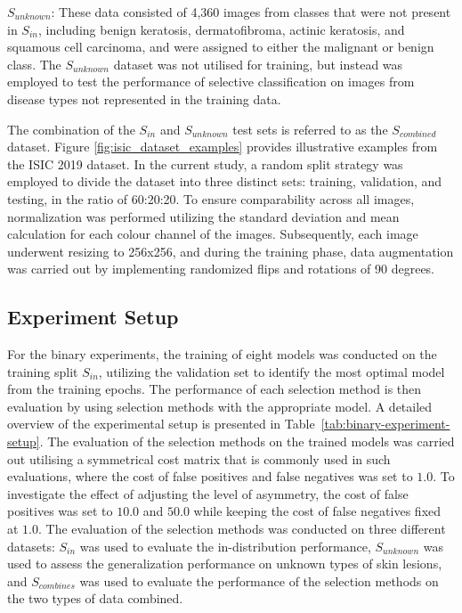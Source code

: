 $S_{unknown}$: These data consisted of 4,360 images from classes that were not present in $S_{in}$, including benign keratosis, dermatofibroma, actinic keratosis, and squamous cell carcinoma, and were assigned to either the malignant or benign class. The $S_{unknown}$ dataset was not utilised for training, but instead was employed to test the performance of selective classification on images from disease types not represented in the training data.

The combination of the $S_{in}$ and $S_{unknown}$ test sets is referred to as the $S_{combined}$ dataset. Figure \ref{fig:isic_dataset_examples} provides illustrative examples from the ISIC 2019 dataset. In the current study, a random split strategy was employed to divide the dataset into three distinct sets: training, validation, and testing, in the ratio of 60:20:20. To ensure comparability across all images, normalization was performed utilizing the standard deviation and mean calculation for each colour channel of the images. Subsequently, each image underwent resizing to 256x256, and during the training phase, data augmentation was carried out by implementing randomized flips and rotations of 90 degrees.

\subsection{Experiment Setup}
For the binary experiments, the training of eight models was conducted on the training split $S_{in}$, utilizing the validation set to identify the most optimal model from the training epochs. The performance of each selection method is then evaluation by using selection methods with the appropriate model. A detailed overview of the experimental setup is presented in Table~\ref{tab:binary-experiment-setup}. The evaluation of the selection methods on the trained models was carried out utilising a symmetrical cost matrix that is commonly used in such evaluations, where the cost of false positives and false negatives was set to $1.0$. To investigate the effect of adjusting the level of asymmetry, the cost of false positives was set to $10.0$ and $50.0$ while keeping the cost of false negatives fixed at $1.0$. The evaluation of the selection methods was conducted on three different datasets: $S_{in}$ was used to evaluate the in-distribution performance, $S_{unknown}$ was used to assess the generalization performance on unknown types of skin lesions, and $S_{combines}$ was used to evaluate the performance of the selection methods on the two types of data combined.

